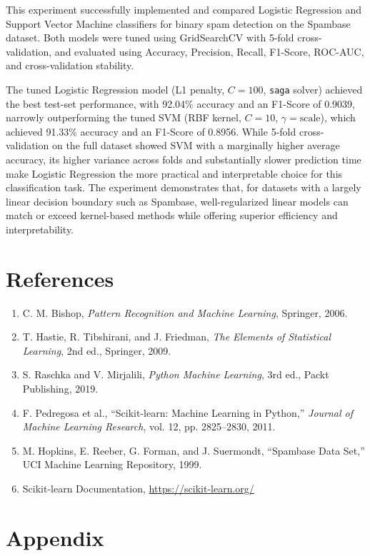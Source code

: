 \documentclass[12pt,a4paper]{article}
\begin{document}
This experiment successfully implemented and compared Logistic Regression and Support Vector Machine classifiers for binary spam detection on the Spambase dataset. Both models were tuned using GridSearchCV with 5-fold cross-validation, and evaluated using Accuracy, Precision, Recall, F1-Score, ROC-AUC, and cross-validation stability.

The tuned Logistic Regression model (L1 penalty, $C=100$, \texttt{saga} solver) achieved the best test-set performance, with 92.04\% accuracy and an F1-Score of 0.9039, narrowly outperforming the tuned SVM (RBF kernel, $C=10$, $\gamma=\text{scale}$), which achieved 91.33\% accuracy and an F1-Score of 0.8956. While 5-fold cross-validation on the full dataset showed SVM with a marginally higher average accuracy, its higher variance across folds and substantially slower prediction time make Logistic Regression the more practical and interpretable choice for this classification task. The experiment demonstrates that, for datasets with a largely linear decision boundary such as Spambase, well-regularized linear models can match or exceed kernel-based methods while offering superior efficiency and interpretability.

\section{References}

\begin{enumerate}
\item C. M. Bishop, \textit{Pattern Recognition and Machine Learning}, Springer, 2006.
\item T. Hastie, R. Tibshirani, and J. Friedman, \textit{The Elements of Statistical Learning}, 2nd ed., Springer, 2009.
\item S. Raschka and V. Mirjalili, \textit{Python Machine Learning}, 3rd ed., Packt Publishing, 2019.
\item F. Pedregosa et al., ``Scikit-learn: Machine Learning in Python,'' \textit{Journal of Machine Learning Research}, vol. 12, pp. 2825--2830, 2011.
\item M. Hopkins, E. Reeber, G. Forman, and J. Suermondt, ``Spambase Data Set,'' UCI Machine Learning Repository, 1999.
\item Scikit-learn Documentation, \url{https://scikit-learn.org/}
\end{enumerate}

\section*{Appendix}
\end{document}
